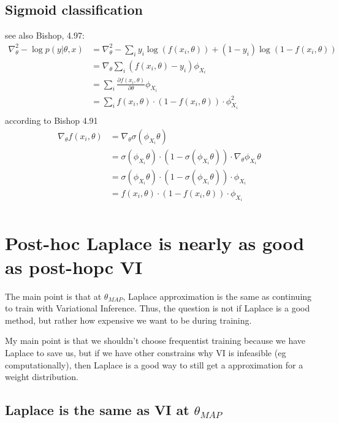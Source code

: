 \documentclass[a4paper]{scrartcl}
\begin{document}
  \subsection{Sigmoid classification}
    see also Bishop, 4.97:
    \begin{align}
      \nabla^2_\theta -\log p(y \vert \theta, x) 
      &= \nabla^2_\theta - \sum_i y_i \log(f(x_i, \theta)) + (1 - y_i) \log(1-f(x_i, \theta))\\
      &= \nabla_\theta \sum_i (f(x_i, \theta)- y_i) \phi_{X_i}\\
      &= \sum_i \frac{\partial f(x_i, \theta)}{ \partial \theta} \phi_{X_i}\\
      &= \sum_i f(x_i, \theta) \cdot (1 - f(x_i, \theta)) \cdot \phi_{X_i}^2\\
    \end{align}
    according to Bishop 4.91
    \begin{align}
      \nabla_\theta f(x_i, \theta) 
      &= \nabla_\theta \sigma(\phi_{X_i} \theta)\\
      &= \sigma(\phi_{X_i} \theta) \cdot (1 - \sigma(\phi_{X_i} \theta)) \cdot \nabla_\theta \phi_{X_i} \theta \\
      &= \sigma(\phi_{X_i} \theta) \cdot (1 - \sigma(\phi_{X_i} \theta)) \cdot \phi_{X_i}\\
      &= f(x_i, \theta) \cdot (1 - f(x_i, \theta)) \cdot \phi_{X_i}\\
    \end{align}





\section{Post-hoc Laplace is nearly as good as post-hopc VI}
The main point is that at $\theta_{MAP}$, Laplace approximation is the same
as continuing to train with Variational Inference. Thus, the question is not
if Laplace is a good method, but rather how expensive we want to be during
training.

My main point is that we shouldn't choose frequentist training because we
have Laplace to save us, but if we have other constrains why VI is
infeasible (eg computationally), then Laplace is a good way to still get a
approximation for a weight distribution.

\subsection{Laplace is the same as VI at $\theta_{MAP}$}
\end{document}
